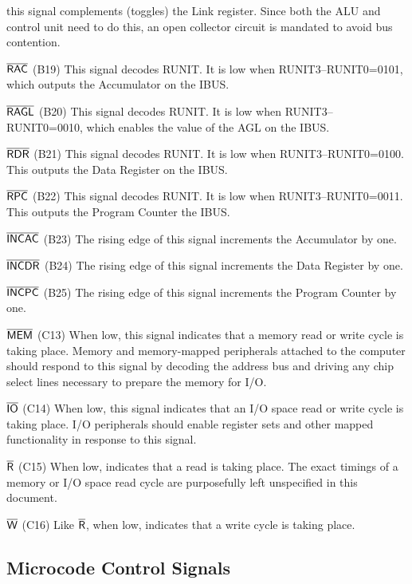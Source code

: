 \documentclass[11pt,a4paper,twocolumns]{article}
\newcommand{\ns}[1]{$\overline{\mbox{\textsf{{#1}}}}$}
\newcommand{\ps}[1]{\textsf{#1}}
\newcommand\bus[1]{{#1}}
\newcommand\unit[1]{{#1}}
\newcommand\IBUS{\bus{IBUS}}
\newcommand\ALU{\unit{ALU}}
\newcommand\AGL{\unit{AGL}}
\newcommand\RUNITn[1]{\ps{RUNIT{#1}}}
\newcommand\RAC{\ns{RAC}}
\newcommand\RAGL{\ns{RAGL}}
\newcommand\RDR{\ns{RDR}}
\newcommand\RPC{\ns{RPC}}
\newcommand\INCAC{\ns{INCAC}}
\newcommand\INCDR{\ns{INCDR}}
\newcommand\INCPC{\ns{INCPC}}
\newcommand\MEM{\ns{MEM}}
\newcommand\IO{\ns{IO}}
\newcommand\WRITE{\ns{W}}
\newcommand\READ{\ns{R}}
\begin{document}
\begin{description}
  this signal complements (toggles) the Link register. Since both the \ALU{}
  and control unit need to do this, an open collector circuit is mandated to
  avoid bus contention.
\item{\bf \RAC} (B19) This signal decodes \RUNITn{}. It is low when
  \RUNITn{3}–\RUNITn{0}=\textsf{0101}, which outputs the Accumulator on the
  \IBUS.
\item{\bf \RAGL} (B20) This signal decodes \RUNITn{}. It is low when
  \RUNITn{3}–\RUNITn{0}=\textsf{0010}, which enables the value of the \AGL{} on
  the \IBUS.
\item{\bf \RDR} (B21) This signal decodes \RUNITn{}. It is low when
  \RUNITn{3}–\RUNITn{0}=\textsf{0100}. This outputs the Data Register on the
  \IBUS.
\item{\bf \RPC} (B22) This signal decodes \RUNITn{}. It is low when
  \RUNITn{3}–\RUNITn{0}=\textsf{0011}. This outputs the Program Counter the
  \IBUS.
\item{\bf \INCAC} (B23) The rising edge of this signal increments the
  Accumulator by one.
\item{\bf \INCDR} (B24) The rising edge of this signal increments the Data
  Register by one.
\item{\bf \INCPC} (B25) The rising edge of this signal increments the Program
  Counter by one.
\item{\bf \MEM} (C13) When low, this signal indicates that a memory read or
  write cycle is taking place. Memory and memory-mapped peripherals attached to
  the computer should respond to this signal by decoding the address bus and
  driving any chip select lines necessary to prepare the memory for I/O.
\item{\bf \IO} (C14) When low, this signal indicates that an I/O space read or
  write cycle is taking place. I/O peripherals should enable register sets and
  other mapped functionality in response to this signal.
\item{\bf \READ} (C15) When low, indicates that a read is taking place. The
  exact timings of a memory or I/O space read cycle are purposefully left
  unspecified in this document.
\item{\bf \WRITE} (C16) Like \READ, when low, indicates that a write cycle is
  taking place.
\end{description}

\subsection{Microcode Control Signals}
\end{document}
